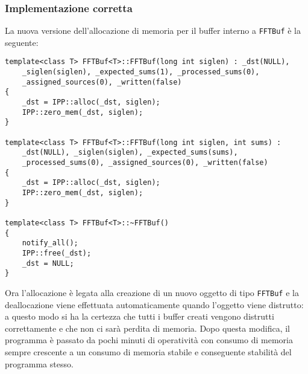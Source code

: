 \subsubsection{Implementazione corretta}
La nuova versione dell'allocazione di  memoria per il buffer interno a
\texttt{FFTBuf} \`e la seguente:
\begin{lstlisting}
template<class T> FFTBuf<T>::FFTBuf(long int siglen) : _dst(NULL),
    _siglen(siglen), _expected_sums(1), _processed_sums(0),
    _assigned_sources(0), _written(false)
{
    _dst = IPP::alloc(_dst, siglen);
    IPP::zero_mem(_dst, siglen);
}

template<class T> FFTBuf<T>::FFTBuf(long int siglen, int sums) :
    _dst(NULL), _siglen(siglen), _expected_sums(sums),
    _processed_sums(0), _assigned_sources(0), _written(false)
{
    _dst = IPP::alloc(_dst, siglen);
    IPP::zero_mem(_dst, siglen);
}

template<class T> FFTBuf<T>::~FFTBuf()
{
    notify_all();
    IPP::free(_dst);
    _dst = NULL;
}
\end{lstlisting}
Ora l'allocazione \`e legata alla creazione di un nuovo oggetto di tipo
\texttt{FFTBuf} e la deallocazione viene effettuata automaticamente quando
l'oggetto viene distrutto: a questo modo si ha la certezza che tutti i buffer
creati vengono distrutti correttamente e che non ci sar\`a perdita di memoria.
Dopo questa modifica, il programma \`e passato da pochi minuti di operativit\`a
con consumo di memoria sempre crescente a un consumo di memoria stabile e
conseguente stabilit\`a del programma stesso.

